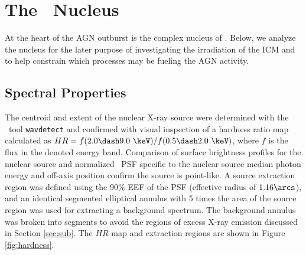 \documentclass[useAMS,usenatbib]{mn2e}
\begin{document}
\section{The \irs\ Nucleus}
\label{sec:nucleus}

At the heart of the AGN outburst is the complex nucleus of
\irs. Below, we analyze the nucleus for the later purpose of
investigating the irradiation of the ICM and to help constrain which
processes may be fueling the AGN activity.

\subsection{Spectral Properties}

The centroid and extent of the nuclear X-ray source were determined
with the \ciao\ tool {\tt wavdetect} and confirmed with visual
inspection of a hardness ratio map calculated as $HR = f(2.0 \dash 9.0
~\keV) / f(0.5 \dash 2.0 ~\keV)$, where $f$ is the flux in the denoted
energy band. Comparison of surface brightness profiles for the nuclear
source and normalized \cxo\ PSF specific to the nuclear source median
photon energy and off-axis position confirm the source is
point-like. A source extraction region was defined using the 90\% EEF
of the PSF (effective radius of $1.16\arcs$), and an identical
segmented elliptical annulus with 5 times the area of the source
region was used for extracting a background spectrum. The background
annulus was broken into segments to avoid the regions of excess X-ray
emission discussed in Section \ref{sec:sub}. The $HR$ map and
extraction regions are shown in Figure \ref{fig:hardness}.
\end{document}
